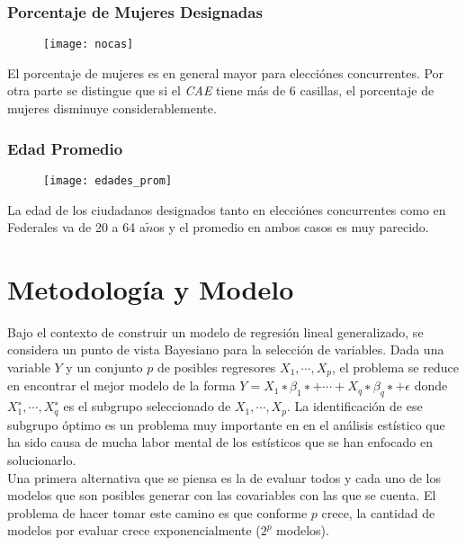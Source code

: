\documentclass[DIV=calc, 
					paper=letter, 
					fontsize=11pt, 
					twocolumn]{scrartcl}
\begin{document}
\subsubsection{Porcentaje de Mujeres Designadas}
\vspace{3mm}

\begin{figure}[H]
\caption{}
\centering\texttt{[image: nocas]}
\label{fig:mujeres}
\end{figure}

El porcentaje de mujeres es en general mayor para elecci\'ones concurrentes. Por otra parte se distingue que si el \textit{CAE} tiene m\'as de 6 casillas, el porcentaje de mujeres disminuye considerablemente.

\subsubsection{Edad Promedio}
\vspace{3mm}

\begin{figure}[H]
\caption{}
\centering\texttt{[image: edades\_prom]}
\label{fig:edades_prom}
\end{figure}

La edad de los ciudadanos designados tanto en elecci\'ones concurrentes como en Federales va de 20 a 64 a$\tilde{n}$os y el promedio en ambos casos es muy parecido.\\

\section{Metodolog\'ia y Modelo}

Bajo el contexto de construir un modelo de regresi\'on lineal generalizado, se considera un punto de vista Bayesiano para la selecci\'on de variables. Dada una variable $Y$ y un conjunto $p$ de posibles regresores $X_1,\cdots,X_p$, el problema se reduce en encontrar el mejor modelo de la forma $Y = X_1∗\beta_1∗ +\cdots+X_q∗\beta_q∗ +\epsilon$ donde $X_1^∗,\cdots,X_q^∗$ es el subgrupo seleccionado de  $X_1,\cdots,X_p$. La identificaci\'on de ese subgrupo \'optimo es un problema muy importante en en el an\'alisis est\'istico que ha sido causa de mucha labor mental de los est\'isticos que se han enfocado en solucionarlo.\\

Una primera alternativa que se piensa es la de evaluar todos y cada uno de los modelos que son posibles generar con las covariables con las que se cuenta. El problema de hacer tomar este camino es que conforme $p$ crece, la cantidad de modelos por evaluar crece exponencialmente ($2 ^{p}$ modelos).\\
\end{document}
